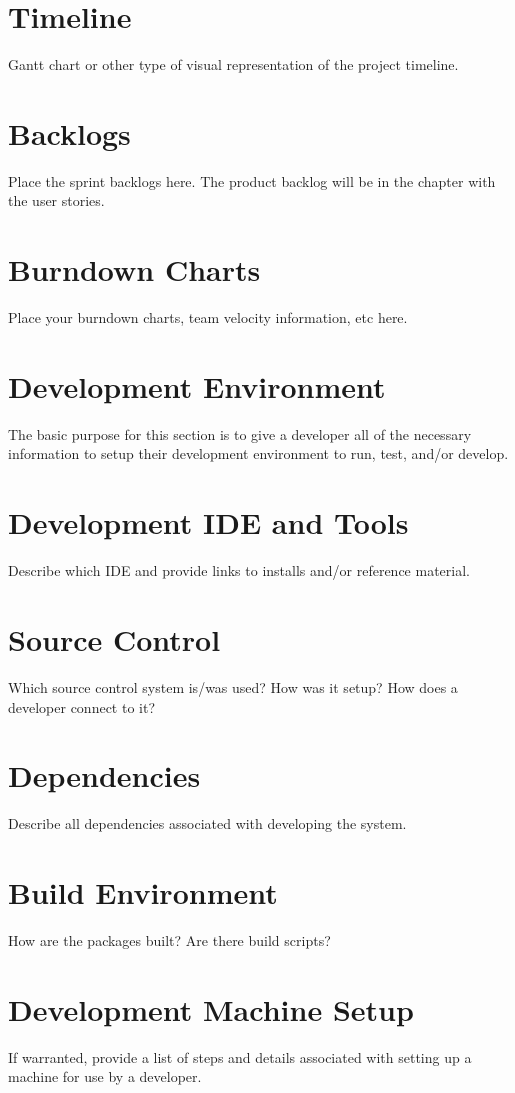 \section{Timeline}
Gantt chart or other type of visual representation of the project timeline.

\section{Backlogs}
Place the sprint backlogs here.    The product backlog will be in the chapter with the user 
stories.

\section{Burndown Charts}
Place your burndown charts, team velocity information, etc here.   


\section{Development Environment}
The basic purpose for this section is to give a developer all of the necessary 
information to setup their development environment to run, test, and/or develop. 


\section{Development IDE and Tools}
Describe which IDE and provide links to installs and/or reference material. 

\section{Source  Control}
Which source control system is/was used?  How was it setup?  How does a developer 
connect to it? 

\section{Dependencies}
Describe all dependencies associated with developing the system. 

\section{Build  Environment}
How are the packages built?  Are there build scripts? 

\section{Development Machine Setup}
If warranted, provide a list of steps and details associated with setting up a 
machine for use by a developer. 


